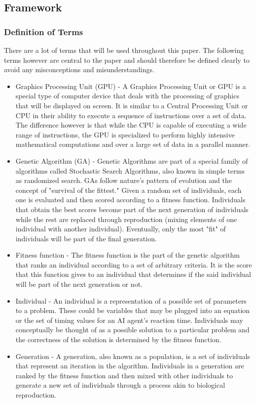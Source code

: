 \subsection*{Framework}
\subsubsection*{Definition of Terms}
There are a lot of terms that will be used throughout this paper.
The following terms however are central to the paper and should therefore be defined clearly
to avoid any misconceptions and misunderstandings.

\begin{itemize}
 \item Graphics Processing Unit (GPU) -  A Graphics Processing Unit or GPU is a special type
of computer device that deals with the processing of graphics that will be displayed
on screen. It is similar to a Central Processing Unit or CPU in their ability to execute
a sequence of instructions over a set of data. The difference however is that while the
CPU is capable of executing a wide range of instructions, the GPU is specialized to perform
highly intensive mathematical computations and over a large set of data in a parallel manner.

 \item Genetic Algorithm (GA) - Genetic Algorithms are part of a special family of algorithms
called Stochastic Search Algorithms, also known in simple terms as randomized search. GAs
follow nature's pattern of evolution and the concept of "survival of the fittest." Given
a random set of individuals, each one is evaluated and then scored according to a fitness function.
Individuals that obtain the best scores become part of the next generation of individuals while the
rest are replaced through reproduction (mixing elements of one individual with another individual).
Eventually, only the most "fit" of individuals will be part of the final generation.

 \item Fitness function - The fitness function is the part of the genetic algorithm that ranks
an individual according to a set of arbitrary criteria. It is the score that this function
gives to an individual that determines if the said individual will be part of the next generation
or not.

 \item Individual - An individual is a representation of a possible set of parameters to a problem.
These could be variables that may be plugged into an equation or the set of timing values for an
AI agent's reaction time. Individuals may conceptually be thought of as a possible solution to a
particular problem and the correctness of the solution is determined by the fitness function.

 \item Generation - A generation, also known as a population, is a set of individuals that represent
an iteration in the algorithm. Individuals in a generation are ranked by the fitness function and then
mixed with other individuals to generate a new set of individuals through a process akin to biological
reproduction.

\end{itemize}

